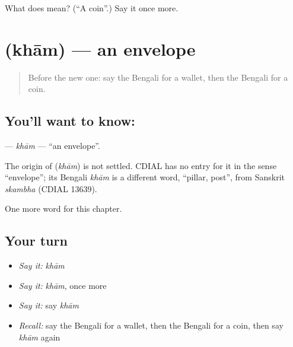 \begin{tcolorbox}[breakable,colback=teal!4,colframe=teal!35!black,title={Before you move on}]
What does  mean? (\textquotedblleft{}A coin\textquotedblright{}.) Say it once more.
\end{tcolorbox}
\section[\texorpdfstring{\bn{খাম} (khām)}{খাম (khām)}]{ (khām) — an envelope}

\label{lesson:BN-C130-kham}



\begin{quote}
Before the new one: say the Bengali for a wallet, then the Bengali for a coin.
\end{quote}

\subsection*{You'll want to know: }
\textbf{} — \emph{khām} — \textquotedblleft{}an envelope\textquotedblright{}.

\begin{cousinweb}
The origin of \textbf{} (\emph{khām}) is not settled. CDIAL has no entry for it in the sense \textquotedblleft{}envelope\textquotedblright{}; its Bengali \emph{khām} is a different word, \textquotedblleft{}pillar, post\textquotedblright{}, from Sanskrit \emph{skambha} (CDIAL 13639).
\end{cousinweb}

\begin{grammarlens}[title={What you've built}]
One more word for this chapter.
\end{grammarlens}

\subsection*{Your turn}
\begin{itemize}
\raggedright
  \item \emph{Say it:} \emph{khām}
  \item \emph{Say it:} \emph{khām}, once more
  \item \emph{Say it:} say \emph{khām}
  \item \emph{Recall:} say the Bengali for a wallet, then the Bengali for a coin, then say \emph{khām} again
\end{itemize}

